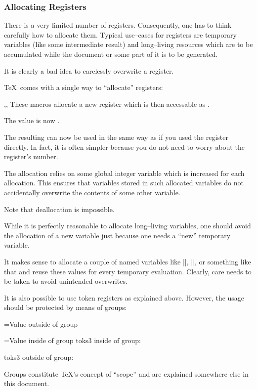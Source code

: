 \documentclass[a4paper,doc2]{ltxdoc}
\begin{document}
\subsubsection{Allocating Registers}
There is a very limited number of registers. Consequently, one has to think carefully how to allocate them. Typical use--cases for registers are temporary variables (like some intermediate result) and long--living resources which are to be accumulated while the document or some part of it is to be generated.

It is clearly a bad idea to carelessly overwrite a register.

\TeX\ comes with a single way to ``allocate'' registers:
\begin{commandlist}{\newdimen{},\newcount{},\newtoks{}}
	These macros allocate a new register which is then accessable as .
\begin{codeexample}[]
\newdimen\variable

\variable=42pt

The value is now \the\variable.
\end{codeexample}

	The resulting  can now be used in the same way as if you used the register directly. In fact, it is often simpler because you do not need to worry about the register's number.

	The allocation relies on some global integer variable which is increased for each allocation. This ensures that variables stored in such allocated variables do not accidentally overwrite the contents of some other variable.

	Note that deallocation is impossible.
\end{commandlist}

While it is perfectly reasonable to allocate long--living variables, one should
avoid the allocation of a new variable just because one needs a ``new''
temporary variable.

It makes sense to allocate a couple of named variables like |\tempa|, |\tempb|, or something like that and reuse these values for every temporary evaluation. Clearly, care needs to be taken to avoid unintended overwrites.

It is also possible to use token registers as explained above. However, the usage should be protected by means of groups:
\begin{codeexample}[]
={Value outside of group}

\begingroup
{}={Value inside of group}
toks3 inside of group: \the{}
\endgroup

toks3 outside of group: \the{}
\end{codeexample}
	Groups constitute \TeX's concept of ``scope'' and are explained somewhere else in this document.
\end{document}
